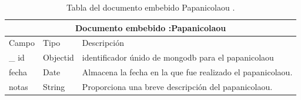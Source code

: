 	
	
	
	
	
	
	
	 \clearpage
	 
	 \begin{table}[htb]
	\centering
	\begin{tabular}{| p{3.5cm}| p{3.0cm} | p{9.8cm} |}
	\hline
	\multicolumn{3}{|c|}{Documento embebido :Papanicolaou} \\
	\hline
	Campo & Tipo &  Descripción\\ \hline
	
	\_ id & Objectid &identificador únido de mongodb para el papanicolaou  \\ \hline
	
	fecha & Date & Almacena la fecha en la que fue realizado el papanicolaou.
	\\ \hline
	notas & String & Proporciona una breve descripción del papanicolaou.  \\ \hline

	\end{tabular}
	\caption{Tabla del documento embebido Papanicolaou .}
	\label{tabla:diccionarioDatos}
	\end{table}
	 
